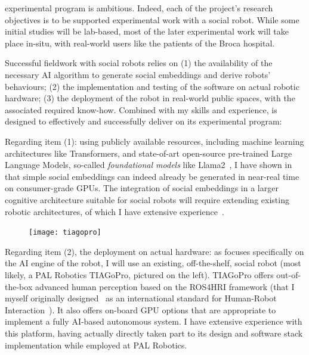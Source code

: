 \project experimental program is ambitious. Indeed, each of the project's
research objectives is to be supported experimental work with
a social robot. While some initial studies will be lab-based, most of the later
experimental work will take place in-situ, with real-world users like the
patients of the Broca hospital.

Successful fieldwork with social robots relies on (1) the availability of
the necessary AI algorithm to generate social embeddings and derive robots'
behaviours; (2) the implementation and testing of the software on actual robotic
hardware; (3) the deployment of the robot in real-world public spaces, with the
associated required know-how. Combined with my skills and experience, \project
is designed to effectively and successfully deliver on its experimental program:

Regarding item (1): using publicly available resources, including machine
learning architectures like Transformers, and state-of-art open-source
pre-trained Large Language Models, so-called \emph{foundational models} like
Llama2~\cite{touvron2023llama}, I have shown in~\cite{lemaignan2024social} that
simple social embeddings can indeed already be generated in near-real time on
consumer-grade GPUs. The integration of social embeddings in a larger cognitive
architecture suitable for social robots will require extending existing
robotic architectures, of which I have extensive
experience~\cite{lemaignan2017artificial, lemaignan2015pyrobots,
baxter2016cognitive,lemaignan2014challenges,lemaignan2011what}.

\begin{figure}
    \centering
    \vspace{-10pt}
    \texttt{[image: tiagopro]}
    \label{fig|tiagopro}
\end{figure}

Regarding item (2), the deployment on actual hardware: as \project focuses
specifically on the AI engine of the robot, I will use an existing,
off-the-shelf, social robot (most likely, a PAL Robotics TIAGoPro, pictured on
the left). TIAGoPro offers out-of-the-box advanced human perception based on the
ROS4HRI framework (that I myself originally
designed~\autocite{mohamed2021ros4hri} as an international standard for
Human-Robot Interaction~\autocite{lemaignan2022ros}). It also offers on-board
GPU options that are appropriate to implement a fully AI-based autonomous
system.  I have extensive experience with this platform, having actually
directly taken part to its design and software stack implementation while
employed at PAL Robotics.

